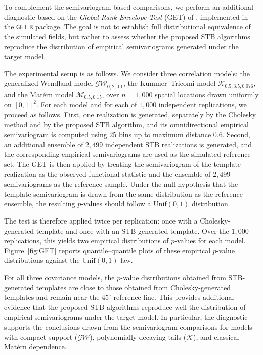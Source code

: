 \documentclass[
  12pt]{article}
\begin{document}
To complement the semivariogram-based comparisons, we perform an additional diagnostic based on the \emph{Global Rank Envelope Test} (GET) of \citet{globale}, implemented in the \texttt{GET} \texttt{R} package.
The goal is not to establish full distributional equivalence of the simulated fields, but rather to assess whether the proposed STB algorithms reproduce the distribution of empirical semivariograms generated under the target model.

The experimental setup is as follows.
We consider three correlation models: the generalized Wendland model $\mathcal{GW}_{0,2,0.1}$, the Kummer--Tricomi model $\mathcal{K}_{0.5,3.5,0.076}$, and the Mat\'ern model $\mathcal{M}_{0.5,0.15}$, over $n=1{,}000$ spatial locations drawn uniformly on $[0,1]^2$.
For each model and for each of $1{,}000$ independent replications, we proceed as follows.
First, one realization is generated, separately by the Cholesky method and by the proposed STB algorithm, and its omnidirectional empirical semivariogram is computed using $25$ bins up to maximum distance $0.6$.
Second, an additional ensemble of $2{,}499$ independent STB realizations is generated, and the corresponding empirical semivariograms are used as the simulated reference set.
The GET is then applied by treating the semivariogram of the template realization as the observed functional statistic and the ensemble of $2{,}499$ semivariograms as the reference sample.
Under the null hypothesis that the template semivariogram is drawn from the same distribution as the reference ensemble, the resulting $p$-values should follow a $\mathrm{Unif}(0,1)$ distribution.

The test is therefore applied twice per replication: once with a Cholesky-generated template and once with an STB-generated template.
Over the $1{,}000$ replications, this yields two empirical distributions of $p$-values for each model.
Figure~\ref{fig:GET} reports quantile--quantile plots of these empirical $p$-value distributions against the $\mathrm{Unif}(0,1)$ law.

For all three covariance models, the $p$-value distributions obtained from STB-generated templates are close to those obtained from Cholesky-generated templates and remain near the $45^\circ$ reference line.
This provides additional evidence that the proposed STB algorithms reproduce well the distribution of empirical semivariograms under the target model.
In particular, the diagnostic supports the conclusions drawn from the semivariogram comparisons for models with compact support ($\mathcal{GW}$), polynomially decaying tails ($\mathcal{K}$), and classical Mat\'ern dependence.
\end{document}

